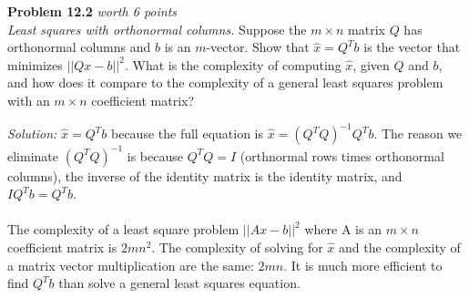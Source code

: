 \documentclass{article}
\newenvironment{problem}[3][Problem]
    { \begin{mdframed}[backgroundcolor=gray!20] \textbf{#1 #2} \textit{worth #3 points} \\}
    {  \end{mdframed}}
\newenvironment{solution}
    {\textit{Solution:}}
    {}
\begin{document}
\begin{problem}{12.2}{6}
\textit{Least squares with orthonormal columns.} Suppose the $m\times n$ matrix $Q$ has orthonormal columns and $b$ is an $m$-vector. Show that  $\hat{x}=Q^Tb$ is the vector that minimizes $\lvert\lvert Qx-b\rvert\rvert^2$. What is the complexity of computing $\hat{x}$, given $Q$ and $b$, and how does it compare to the complexity of a general least squares problem with an $m\times n$ coefficient matrix?
\end{problem}
\begin{solution}
$\hat{x}=Q^Tb$ because the full equation is $\hat{x}=(Q^TQ)^{-1}Q^Tb$. The reason we eliminate $(Q^TQ)^{-1}$ is because $Q^TQ=I$ (orthnormal rows times orthonormal columns), the inverse of the identity matrix is the identity matrix, and $IQ^Tb = Q^Tb$. \\
\\
The complexity of a least square problem $\lvert\lvert Ax-b\rvert\rvert^2$ where A is an $m\times n$ coefficient matrix is $2mn^2$. The complexity of solving for $\hat{x}$ and the complexity of a matrix vector multiplication are the same: $2mn$. It is much more efficient to find $Q^Tb$ than solve a general least squares equation. 
\end{solution}
\end{document}
